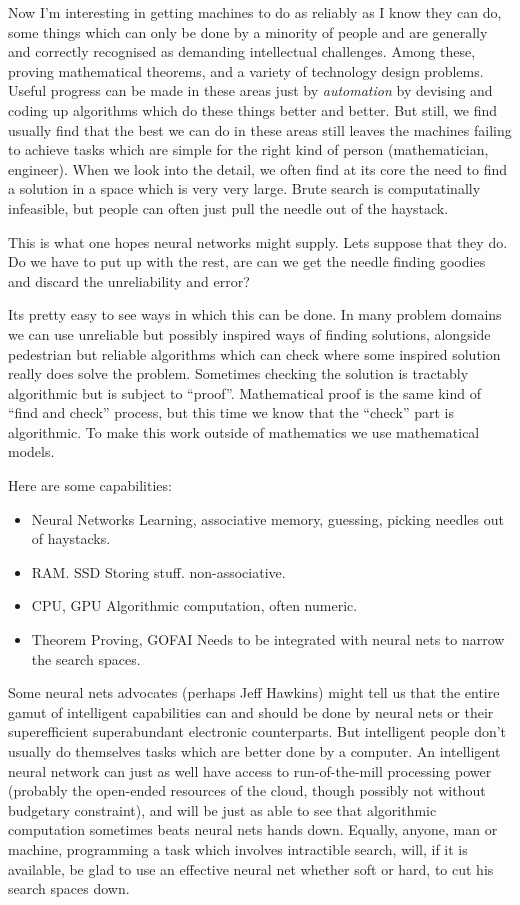 \documentclass[10pt,titlepage]{article}
\begin{document}
Now I'm interesting in getting machines to do as reliably as I know they
can do, some things which can only be done by a minority of people
and are generally and correctly recognised as demanding intellectual challenges.
Among these, proving mathematical theorems, and a variety of technology
design problems.
Useful progress can be made in these areas just by \emph{automation} by
devising and coding up algorithms which do these things better and better.
But still, we find usually find that the best we can do in these areas
still leaves the machines failing to achieve tasks which are simple
for the right kind of person (mathematician, engineer).
When we look into the detail, we often find at its core the need to
find a solution in a space which is very very large.
Brute search is computatinally infeasible, but people can often just
pull the needle out of the haystack.

This is what one hopes neural networks might supply.
Lets suppose that they do.
Do we have to put up with the rest, are can we get the needle finding
goodies and discard the unreliability and error?

Its pretty easy to see ways in which this can be done.
In many problem domains we can use unreliable but possibly inspired
ways of finding solutions, alongside pedestrian but reliable algorithms
which can check where some inspired solution really does solve the
problem.
Sometimes checking the solution is tractably algorithmic but is subject
to ``proof''.
Mathematical proof is the same kind of ``find and check'' process, but
this time we know that the ``check'' part is algorithmic.
To make this work outside of mathematics we use mathematical models.

Here are some capabilities:

\begin{itemize}
\item{Neural Networks}
Learning, associative memory, guessing, picking needles out of haystacks.
\item{RAM. SSD}
Storing stuff. non-associative.
\item{CPU, GPU}
Algorithmic computation, often numeric.
\item{Theorem Proving, GOFAI}
Needs to be integrated with neural nets to narrow the search spaces.
\end{itemize}

Some neural nets advocates (perhaps Jeff Hawkins) might tell us that the entire gamut
of intelligent capabilities can and should be done by neural nets or their superefficient
superabundant electronic counterparts.
But intelligent people don't usually do themselves tasks which are
better done by a computer.
An intelligent neural network can just as well have access to run-of-the-mill
processing power (probably the open-ended resources of the cloud, though possibly
not without budgetary constraint), and will be just as able to see that algorithmic
computation sometimes beats neural nets hands down.
Equally, anyone, man or machine, programming a task which involves intractible
search, will, if it is available, be glad to use an effective neural net whether
soft or hard, to cut his search spaces down.
\end{document}
